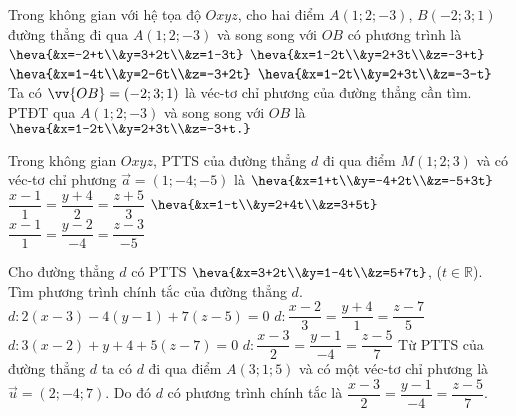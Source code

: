 \begin{ex}%
	Trong không gian với hệ tọa độ $O x y z$, cho hai điểm $A(1;2;-3)$, $B(-2;3;1)$ đường thẳng đi qua $A(1;2;-3)$ và song song với $OB$ có phương trình là 
	\choice 
	{$\heva{&x=-2+t\\&y=3+2t\\&z=1-3t}$}
	{\True $\heva{&x=1-2t\\&y=2+3t\\&z=-3+t}$}
	{$\heva{&x=1-4t\\&y=2-6t\\&z=-3+2t}$}
	{$\heva{&x=1-2t\\&y=2+3t\\&z=-3-t}$}
					\loigiai 
					{
	Ta có $\vv{OB}=(-2;3;1)$ là véc-tơ chỉ phương của đường thẳng cần tìm.\\
	PTĐT qua $A(1;2;-3)$ và song song với $OB$ là $\heva{&x=1-2t\\&y=2+3t\\&z=-3+t.}$
					}
\end{ex}

\begin{ex}%
Trong không gian $O x y z$, PTTS của đường thẳng $d$ đi qua điểm $M(1;2;3)$ và có véc-tơ chỉ phương $\vec{a}=(1;-4;-5)$ là 
\choice 
{$\heva{&x=1+t\\&y=-4+2t\\&z=-5+3t}$}
{$\dfrac{x-1}{1}=\dfrac{y+4}{2}=\dfrac{z+5}{3}$}
{$\heva{&x=1-t\\&y=2+4t\\&z=3+5t}$\True}
{$\dfrac{x-1}{1}=\dfrac{y-2}{-4}=\dfrac{z-3}{-5}$}
\end{ex}

\begin{ex}%
	Cho đường thẳng $d$ có PTTS $\heva{&x=3+2t\\&y=1-4t\\&z=5+7t}$, ($t\in\mathbb{R}$). Tìm phương trình chính tắc của đường thẳng $d$.
		\choice 
		{$d\colon2(x-3)-4(y-1)+7(z-5)=0$}
		{$d\colon\dfrac{x-2}{3}=\dfrac{y+4}{1}=\dfrac{z-7}{5}$}
		{$d\colon3(x-2)+y+4+5(z-7)=0$}
		{$d\colon\dfrac{x-3}{2}=\dfrac{y-1}{-4}=\dfrac{z-5}{7}$\True}
		\loigiai 
		{
Từ PTTS của đường thẳng $d$ ta có $d$ đi qua điểm $A(3;1;5)$ và có một véc-tơ chỉ phương là $\vec{u}=(2;-4;7)$. Do đó $d$ có phương trình chính tắc là $\dfrac{x-3}{2}=\dfrac{y-1}{-4}=\dfrac{z-5}{7}$.
		}
	\end{ex}

